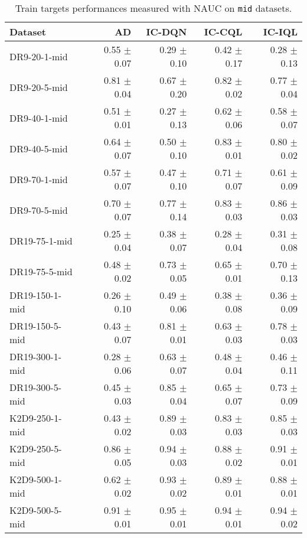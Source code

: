 \begin{table}[ht]
    \label{tab:}
    \begin{center}
    \caption{Train targets performances measured with NAUC on \texttt{mid} datasets.}
    
    \begin{small}
    \begin{adjustbox}{max width=\columnwidth}
		\begin{tabular}{l|rrrr}
		\toprule
	\textbf{Dataset} & \textbf{AD} & \textbf{IC-DQN} & \textbf{IC-CQL} & \textbf{IC-IQL}\\
\midrule
DR9-20-1-mid & 0.55 $\pm$ 0.07 & 0.29 $\pm$ 0.10 & 0.42 $\pm$ 0.17 & 0.28 $\pm$ 0.13\\
DR9-20-5-mid & 0.81 $\pm$ 0.04 & 0.67 $\pm$ 0.20 & 0.82 $\pm$ 0.02 & 0.77 $\pm$ 0.04\\
DR9-40-1-mid & 0.51 $\pm$ 0.01 & 0.27 $\pm$ 0.13 & 0.62 $\pm$ 0.06 & 0.58 $\pm$ 0.07\\
DR9-40-5-mid & 0.64 $\pm$ 0.07 & 0.50 $\pm$ 0.10 & 0.83 $\pm$ 0.01 & 0.80 $\pm$ 0.02\\
DR9-70-1-mid & 0.57 $\pm$ 0.07 & 0.47 $\pm$ 0.10 & 0.71 $\pm$ 0.07 & 0.61 $\pm$ 0.09\\
DR9-70-5-mid & 0.70 $\pm$ 0.07 & 0.77 $\pm$ 0.14 & 0.83 $\pm$ 0.03 & 0.86 $\pm$ 0.03\\
DR19-75-1-mid & 0.25 $\pm$ 0.04 & 0.38 $\pm$ 0.07 & 0.28 $\pm$ 0.04 & 0.31 $\pm$ 0.08\\
DR19-75-5-mid & 0.48 $\pm$ 0.02 & 0.73 $\pm$ 0.05 & 0.65 $\pm$ 0.01 & 0.70 $\pm$ 0.13\\
DR19-150-1-mid & 0.26 $\pm$ 0.10 & 0.49 $\pm$ 0.06 & 0.38 $\pm$ 0.08 & 0.36 $\pm$ 0.09\\
DR19-150-5-mid & 0.43 $\pm$ 0.07 & 0.81 $\pm$ 0.01 & 0.63 $\pm$ 0.03 & 0.78 $\pm$ 0.03\\
DR19-300-1-mid & 0.28 $\pm$ 0.06 & 0.63 $\pm$ 0.07 & 0.48 $\pm$ 0.04 & 0.46 $\pm$ 0.11\\
DR19-300-5-mid & 0.45 $\pm$ 0.03 & 0.85 $\pm$ 0.04 & 0.65 $\pm$ 0.07 & 0.73 $\pm$ 0.09\\
K2D9-250-1-mid & 0.43 $\pm$ 0.02 & 0.89 $\pm$ 0.03 & 0.83 $\pm$ 0.03 & 0.85 $\pm$ 0.03\\
K2D9-250-5-mid & 0.86 $\pm$ 0.05 & 0.94 $\pm$ 0.03 & 0.88 $\pm$ 0.02 & 0.91 $\pm$ 0.01\\
K2D9-500-1-mid & 0.62 $\pm$ 0.02 & 0.93 $\pm$ 0.02 & 0.89 $\pm$ 0.01 & 0.88 $\pm$ 0.01\\
K2D9-500-5-mid & 0.91 $\pm$ 0.01 & 0.95 $\pm$ 0.01 & 0.94 $\pm$ 0.01 & 0.94 $\pm$ 0.02\\

\end{tabular}
\end{adjustbox}
\end{small}
\end{center}
\end{table}
